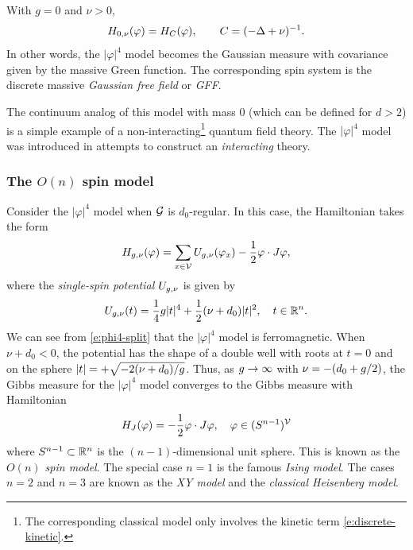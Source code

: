 \begin{example}
With $g = 0$ and $\nu > 0$,
\begin{equation}
H_{0,\nu}(\varphi) = H_C(\varphi),
	\qquad
C = (-\Delta + \nu)^{-1}.
\end{equation}
In other words, the $|\varphi|^4$ model becomes the Gaussian measure with covariance given
by the massive Green function. The corresponding spin system is the discrete massive
\emph{Gaussian free field} or \emph{GFF}.

The continuum analog of this model with mass $0$
(which can be defined for $d > 2$) is a simple example of a
non-interacting\footnote{The corresponding classical model only involves the kinetic term
\eqref{e:discrete-kinetic}.} quantum field theory. The $|\varphi|^4$ model was introduced
in attempts to construct an \emph{interacting} theory.
\end{example}

\subsubsection{The $O(n)$ spin model}

Consider the $|\varphi|^4$ model when $\mathcal{G}$ is $d_0$-regular. In this case,
the Hamiltonian takes the form
\begin{equation}
\label{e:phi4-split}
H_{g,\nu}(\varphi)
  =
\sum_{x\in\mathcal{V}} U_{g,\nu}(\varphi_x) - \frac{1}{2} \varphi \cdot J \varphi,
\end{equation}
where the \emph{single-spin potential} $U_{g,\nu}$ is given by
\begin{equation}
U_{g,\nu}(t)
	=
\frac{1}{4} g |t|^4
	+
\frac{1}{2} (\nu + d_0) |t|^2,
	\quad
t \in {\mathbb R}^n.
\end{equation}
We can see from \eqref{e:phi4-split} that the $|\varphi|^4$ model is ferromagnetic.
When $\nu + d_0 < 0$, the potential has the shape of a double well with roots at
$t = 0$ and on the sphere $|t| = +\sqrt{-2 (\nu + d_0) / g}$.
Thus, as $g\rightarrow\infty$ with $\nu = -(d_0 + g/2)$, the Gibbs measure for the
$|\varphi|^4$ model converges to the Gibbs measure with Hamiltonian
\begin{equation}
\label{e:on-model}
H_J(\varphi) = -\frac12 \varphi \cdot J \varphi,
	\quad
\varphi \in (S^{n-1})^{\mathcal{V}}
\end{equation}
where $S^{n-1} \subset {\mathbb R}^n$ is the $(n-1)$-dimensional unit sphere.
This is known as the \emph{$O(n)$ spin model}. The special case $n = 1$ is the
famous \emph{Ising model}. The cases $n = 2$ and $n = 3$ are known as the
\emph{XY model} and the \emph{classical Heisenberg model}.

